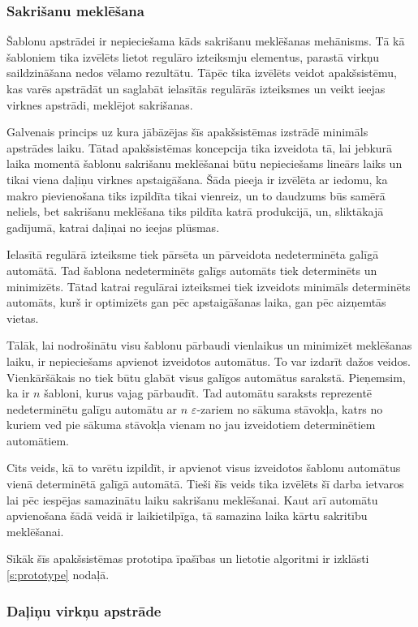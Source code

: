 \subsubsection{\label{sbsbs:sys_matches}Sakrišanu meklēšana}

Šablonu apstrādei ir nepieciešama kāds sakrišanu meklēšanas mehānisms. Tā kā šabloniem tika izvēlēts lietot regulāro izteiksmju elementus, parastā virkņu saildzināšana nedos vēlamo rezultātu. Tāpēc tika izvēlēts veidot apakšsistēmu, kas varēs apstrādāt un saglabāt ielasītās regulārās izteiksmes un veikt ieejas virknes apstrādi, meklējot sakrišanas.

Galvenais princips uz kura jābāzējas šīs apakšsistēmas izstrādē minimāls apstrādes laiku. Tātad apakšsistēmas koncepcija  tika izveidota tā, lai jebkurā laika momentā šablonu sakrišanu meklēšanai būtu nepieciešams lineārs laiks un tikai viena daļiņu virknes apstaigāšana. Šāda pieeja ir izvēlēta ar iedomu, ka makro pievienošana tiks izpildīta tikai vienreiz, un to daudzums būs samērā neliels, bet sakrišanu meklēšana tiks pildīta katrā produkcijā, un, sliktākajā gadījumā, katrai daļiņai no ieejas plūsmas.

Ielasītā regulārā izteiksme tiek pārsēta un pārveidota nedeterminēta galīgā automātā. Tad šablona nedeterminēts galīgs automāts tiek determinēts un minimizēts. Tātad katrai regulārai izteiksmei tiek izveidots minimāls determinēts automāts, kurš ir optimizēts gan pēc apstaigāšanas laika, gan pēc aizņemtās vietas.

Tālāk, lai nodrošinātu visu šablonu pārbaudi vienlaikus un minimizēt meklēšanas laiku, ir nepieciešams apvienot izveidotos automātus. To var izdarīt dažos veidos. Vienkāršākais no tiek būtu glabāt visus galīgos automātus sarakstā. Pieņemsim, ka ir $n$ šabloni, kurus vajag pārbaudīt. Tad automātu saraksts reprezentē nedeterminētu galīgu automātu ar $n$ $\varepsilon$-zariem no sākuma stāvokļa, katrs no kuriem ved pie sākuma stāvokļa vienam no jau izveidotiem determinētiem automātiem.

Cits veids, kā to varētu izpildīt, ir apvienot visus izveidotos šablonu automātus vienā determinētā galīgā automātā. Tieši šīs veids tika izvēlēts šī darba ietvaros lai pēc iespējas samazinātu laiku sakrišanu meklēšanai. Kaut arī automātu apvienošana šādā veidā ir laikietilpīga, tā samazina laika kārtu sakritību meklēšanai.

Sīkāk šīs apakšsistēmas prototipa īpašības un lietotie algoritmi ir izklāsti \ref{s:prototype} nodaļā.

\subsubsection{\label{sbsbs:sys_language}Daļiņu virkņu apstrāde}

